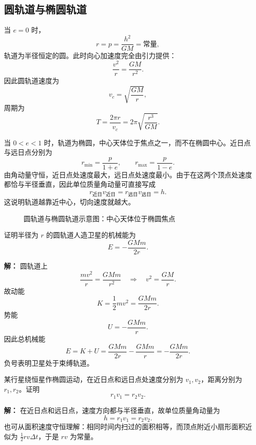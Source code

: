 \subsection{圆轨道与椭圆轨道}

当 $e=0$ 时，
\[
r=p=\frac{h^2}{GM}=\text{常量},
\]
轨道为半径恒定的圆。此时向心加速度完全由引力提供：
\[
\frac{v^2}{r}=\frac{GM}{r^2}.
\]
因此圆轨道速度为
\[
v_c=\sqrt{\frac{GM}{r}},
\]
周期为
\[
T=\frac{2\pi r}{v_c}=2\pi\sqrt{\frac{r^3}{GM}}.
\]

当 $0<e<1$ 时，轨道为椭圆，中心天体位于焦点之一，而不在椭圆中心。近日点与远日点分别为
\[
r_{\min}=\frac{p}{1+e},\qquad r_{\max}=\frac{p}{1-e}.
\]
由角动量守恒，近日点处速度最大，远日点处速度最小。由于在这两个顶点处速度都恰与半径垂直，因此单位质量角动量可直接写成
\[
r_{\text{近日}}v_{\text{近日}}=r_{\text{远日}}v_{\text{远日}}=h.
\]
这说明轨道越靠近中心，切向速度就越大。

\begin{figure}[H]
\centering
{}
\caption{圆轨道与椭圆轨道示意图：中心天体位于椭圆焦点}
\end{figure}

\begin{example}
证明半径为 $r$ 的圆轨道人造卫星的机械能为
\[
E=-\frac{GMm}{2r}.
\]

\textbf{解：} 圆轨道上
\[
\frac{mv^2}{r}=\frac{GMm}{r^2}\quad\Rightarrow\quad v^2=\frac{GM}{r}.
\]
故动能
\[
K=\frac{1}{2}mv^2=\frac{GMm}{2r}.
\]
势能
\[
U=-\frac{GMm}{r}.
\]
因此总机械能
\[
E=K+U=\frac{GMm}{2r}-\frac{GMm}{r}=-\frac{GMm}{2r}.
\]
负号表明卫星处于束缚轨道。
\end{example}

\begin{example}
某行星绕恒星作椭圆运动，在近日点和远日点处速度分别为 $v_1,v_2$，距离分别为 $r_1,r_2$。证明
\[
r_1v_1=r_2v_2.
\]

\textbf{解：} 在近日点和远日点，速度方向都与半径垂直，故单位质量角动量为
\[
h=r_1v_1=r_2v_2.
\]
也可从面积速度守恒理解：相同时间内扫过的面积相等，而顶点附近小扇形面积近似为 $\frac12 rv\Delta t$，于是 $rv$ 为常量。
\end{example}

